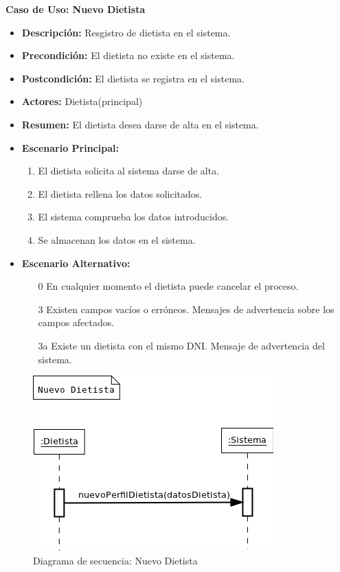\textbf{Caso de Uso: Nuevo Dietista}
\begin{itemize}
\item \textbf{Descripción:} Resgistro de dietista en el sistema.
\item \textbf{Precondición:} El dietista no existe en el sistema.
\item \textbf{Postcondición:} El dietista se registra en el sistema.
\item \textbf{Actores:} Dietista(principal)
\item \textbf{Resumen:} El dietista desea darse de alta en el sistema.
\item \textbf{Escenario Principal:}
\begin{enumerate}
\item El dietista solicita al sistema darse de alta.
\item El dietista rellena los datos solicitados.
\item El sistema comprueba los datos introducidos.
\item Se almacenan los datos en el sistema.
\end{enumerate}
\item \textbf{Escenario Alternativo:}
\begin{enumerate}
\item[0] En cualquier momento el dietista puede cancelar el proceso.
\item[3] Existen campos vacíos o erróneos. Mensajes de advertencia sobre los campos afectados.
\item[3a] Existe un dietista con el mismo DNI. Mensaje de advertencia del sistema.
\end{enumerate}
\end{itemize}
\begin{figure}[H]
  \label{ds_nuevodietista}
  \begin{center}
    \includegraphics[scale=0.7]{../img/DS_NuevoDietista.png}
  \end{center}
  \caption{Diagrama de secuencia: Nuevo Dietista}
\end{figure}
